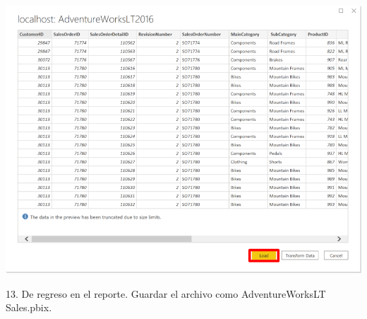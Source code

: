 \documentclass[12pt,letterpaper]{article}
\begin{document}
\begin{center}
    \includegraphics[width=15cm]{img/16.png}  
\end{center}
13. De regreso en el reporte. Guardar el archivo como AdventureWorksLT Sales.pbix.
\end{document}
